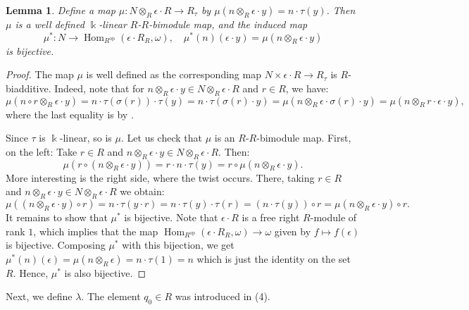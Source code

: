 \documentclass{amsart}
\newtheorem{lem}[equation]{Lemma}
\theoremstyle{definition}
\newcommand{\opn}{\operatorname}
\renewcommand{\k}{\Bbbk}
\numberwithin{equation}{section}
\begin{document}
\begin{lem}\label{lem:mapmu}
Define a map $\mu:N\otimes_R \epsilon\cdot R \to R_{\tau}$ by $\mu(n\otimes_R \epsilon \cdot y) = n \cdot \tau(y)$.
Then $\mu$ is a well defined $\k$-linear $R$-$R$-bimodule map,
and the induced map
\[
\mu^* :N \to \opn{Hom}_{R^{\opn{op}}}(\epsilon \cdot R_R,\omega), \quad \mu^*(n) (\epsilon \cdot y) = \mu(n\otimes_R \epsilon \cdot y)
\]
is bijective.
\end{lem}
\begin{proof}
The map $\mu$ is well defined as the corresponding map $N\times \epsilon \cdot R \to R_{\tau}$ is $R$-biadditive.
Indeed, note that for $n\otimes_R \epsilon \cdot y \in N\otimes_R \epsilon\cdot R$ and $r \in R$,
we have:
\[
\mu(n\circ r \otimes_R \epsilon\cdot y) = n\cdot\tau(\sigma(r))\cdot\tau(y) = n\cdot\tau(\sigma(r)\cdot y) = \mu(n\otimes_R \epsilon\cdot\sigma(r)\cdot y) = \mu(n\otimes_R r\cdot\epsilon\cdot y),
\]
where the last equality is by .

Since $\tau$ is $\k$-linear, so is $\mu$.
Let us check that $\mu$ is an $R$-$R$-bimodule map.
First, on the left:
Take $r \in R$ and $n\otimes_R \epsilon \cdot y \in N\otimes_R \epsilon\cdot R$.
Then:
\[
\mu(r\circ (n\otimes_R \epsilon \cdot y)) = 
r\cdot n \cdot \tau(y) = r \circ \mu(n \otimes_R \epsilon \cdot y).
\]
More interesting is the right side, where the twist occurs.
There, taking $r \in R$ and $n\otimes_R \epsilon \cdot y \in N\otimes_R \epsilon\cdot R$ we obtain:
\[
\mu((n\otimes_R \epsilon \cdot y) \circ r) = 
n\cdot \tau(y\cdot r) = n\cdot \tau(y)\cdot \tau(r) = (n\cdot \tau(y)) \circ r = \mu(n\otimes_R \epsilon \cdot y) \circ r.
\]
It remains to show that $\mu^*$ is bijective.
Note that $\epsilon \cdot R$ is a free right $R$-module of rank $1$,
which implies that the map 
$\opn{Hom}_{R^{\opn{op}}}(\epsilon \cdot R_R,\omega) \to \omega$ given by
$f \mapsto f(\epsilon)$ is bijective.
Composing $\mu^*$ with this bijection, we get
$\mu^*(n)(\epsilon) = \mu(n\otimes_R \epsilon) = n\cdot \tau(1) = n$
which is just the identity on the set $R$.
Hence, $\mu^*$ is also bijective.
\end{proof}

Next, we define $\lambda$. 
The element $q_0 \in R$ was introduced in (4).
\end{document}
